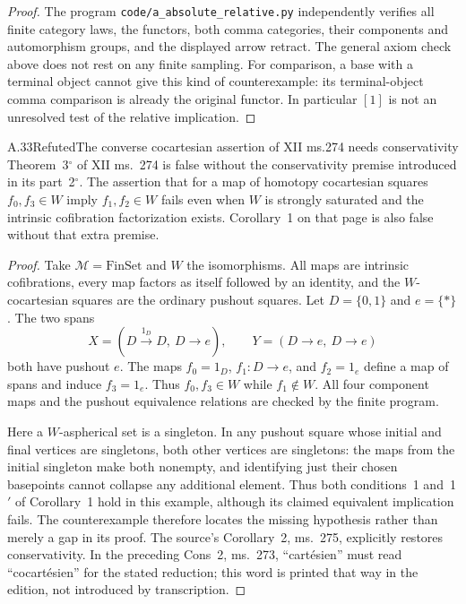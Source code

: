 \begin{proof}
The program \texttt{code/a\_absolute\_relative.py} independently verifies all finite category laws, the functors, both comma categories, their components and automorphism groups, and the displayed arrow retract. The general axiom check above does not rest on any finite sampling. For comparison, a base with a terminal object cannot give this kind of counterexample: its terminal-object comma comparison is already the original functor. In particular $[1]$ is not an unresolved test of the relative implication.
\end{proof}

\begin{claim}{A.33}{Refuted}{The converse cocartesian assertion of XII ms.274 needs conservativity}
Theorem~3$^\circ$ of XII ms.~274 is false without the conservativity premise introduced in its part~2$^\circ$. The assertion that for a map of homotopy cocartesian squares $f_0,f_3\in W$ imply $f_1,f_2\in W$ fails even when $W$ is strongly saturated and the intrinsic cofibration factorization exists. Corollary~1 on that page is also false without that extra premise.
\end{claim}
\begin{proof}
Take $\mathcal M=\mathrm{FinSet}$ and $W$ the isomorphisms. All maps are intrinsic cofibrations, every map factors as itself followed by an identity, and the $W$-cocartesian squares are the ordinary pushout squares. Let $D=\{0,1\}$ and $e=\{*\}$. The two spans
\[
 X=(D\xrightarrow{1_D}D,\ D\longrightarrow e),\qquad
 Y=(D\longrightarrow e,\ D\longrightarrow e)
\]
both have pushout $e$. The maps $f_0=1_D$, $f_1:D\to e$, and $f_2=1_e$ define a map of spans and induce $f_3=1_e$. Thus $f_0,f_3\in W$ while $f_1\notin W$. All four component maps and the pushout equivalence relations are checked by the finite program.

Here a $W$-aspherical set is a singleton. In any pushout square whose initial and final vertices are singletons, both other vertices are singletons: the maps from the initial singleton make both nonempty, and identifying just their chosen basepoints cannot collapse any additional element. Thus both conditions~1 and~1$'$ of Corollary~1 hold in this example, although its claimed equivalent implication fails. The counterexample therefore locates the missing hypothesis rather than merely a gap in its proof. The source's Corollary~2, ms.~275, explicitly restores conservativity. In the preceding Cons~2, ms.~273, ``cart\'esien'' must read ``cocart\'esien'' for the stated reduction; this word is printed that way in the edition, not introduced by transcription.
\end{proof}

